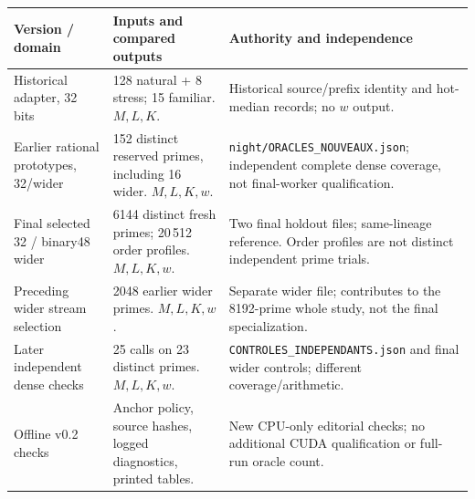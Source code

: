 \documentclass[11pt]{article}
\theoremstyle{definition}\newtheorem{remark}[theorem]{Remark}
\begin{document}
\noindent\begin{tabular}{P{.25\textwidth}P{.26\textwidth}P{.38\textwidth}}
\toprule Version / domain & Inputs and compared outputs & Authority and independence\\\midrule
Historical adapter, 32 bits & 128 natural + 8 stress; 15 familiar. $M,L,K$. & Historical source/prefix identity and hot-median records; no $w$ output.\\
Earlier rational prototypes, 32/wider & 152 distinct reserved primes, including 16 wider. $M,L,K,w$. & \texttt{night/ORACLES\_NOUVEAUX.json}; independent complete dense coverage, not final-worker qualification.\\
Final selected 32 / binary48 wider & 6144 distinct fresh primes; 20\,512 order profiles. $M,L,K,w$. & Two final holdout files; same-lineage reference. Order profiles are not distinct independent prime trials.\\
Preceding wider stream selection & 2048 earlier wider primes. $M,L,K,w$. & Separate wider file; contributes to the 8192-prime whole study, not the final specialization.\\
Later independent dense checks & 25 calls on 23 distinct primes. $M,L,K,w$. & \texttt{CONTROLES\_INDEPENDANTS.json} and final wider controls; different coverage/arithmetic.\\
Offline v0.2 checks & Anchor policy, source hashes, logged diagnostics, printed tables. & New CPU-only editorial checks; no additional CUDA qualification or full-run oracle count.\\
\bottomrule
\end{tabular}

\normalsize
\end{document}
